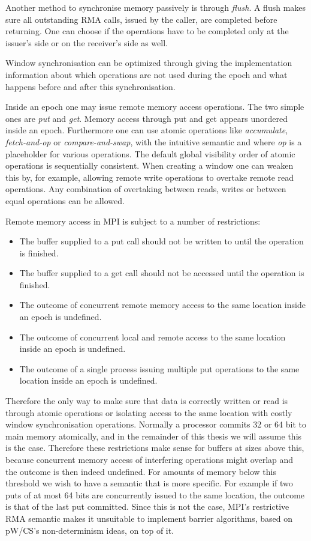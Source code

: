 \documentclass[a4paper, 10pt]{article}
\begin{document}
Another method to synchronise memory passively is through \emph{flush}. A flush makes sure all outstanding RMA calls, issued by the caller, are completed before returning. One can choose if the operations have to be completed only at the issuer's side or on the receiver's side as well.

Window synchronisation can be optimized through giving the implementation information about which operations are not used during the epoch and what happens before and after this synchronisation.

Inside an epoch one may issue remote memory access operations. The two simple ones are \emph{put} and \emph{get}. Memory access through put and get appears unordered inside an epoch.
Furthermore one can use atomic operations like \emph{accumulate}, \emph{fetch-and-op} or \emph{compare-and-swap}, with the intuitive semantic and where \emph{op} is a placeholder for various operations. The default global visibility order of atomic operations is sequentially consistent. When creating a window one can weaken this by, for example, allowing remote write operations to overtake remote read operations. Any combination of overtaking between reads, writes or between equal operations can be allowed.

Remote memory access in MPI is subject to a number of restrictions:
\begin{itemize}
	\item The buffer supplied to a put call should not be written to until the operation is finished.
	\item The buffer supplied to a get call should not be accessed until the operation is finished.
	\item The outcome of concurrent remote memory access to the same location inside an epoch is undefined.
	\item The outcome of concurrent local and remote access to the same location inside an epoch is undefined.
	\item The outcome of a single process issuing multiple put operations to the same location inside an epoch is undefined.
\end{itemize}
Therefore the only way to make sure that data is correctly written or read is through atomic operations or isolating access to the same location with costly window synchronisation operations.
Normally a processor commits 32 or 64 bit to main memory atomically, and in the remainder of this thesis we will assume this is the case.
Therefore these restrictions make sense for buffers at sizes above this, because concurrent memory access of interfering operations might overlap and the outcome is then indeed undefined.
For amounts of memory below this threshold we wish to have a semantic that is more specific. For example if two puts of at most 64 bits are concurrently issued to the same location, the outcome is that of the last put committed. Since this is not the case, MPI's restrictive RMA semantic makes it unsuitable to implement barrier algorithms, based on pW/CS's non-determinism ideas, on top of it.
\end{document}
